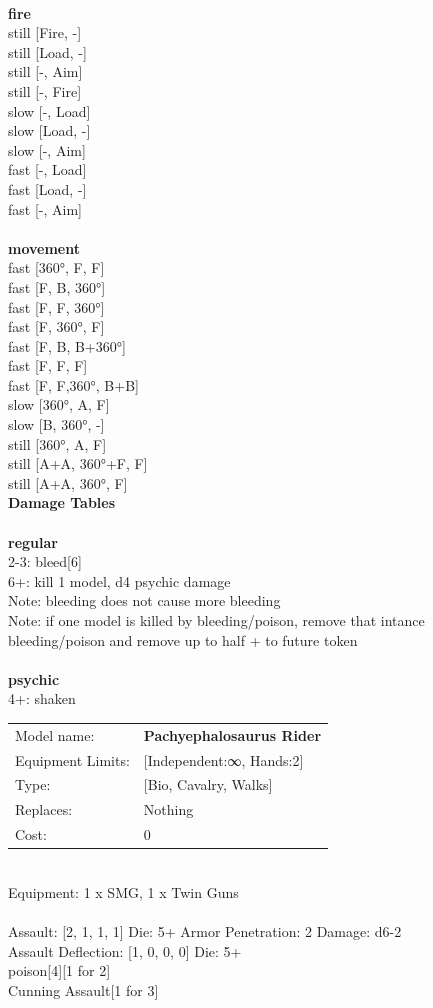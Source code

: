 \ \\ {\bf fire } \\
still [Fire, -] \\
still [Load, -] \\
still [-, Aim] \\
still [-, Fire] \\
slow [-, Load] \\
slow [Load, -] \\
slow [-, Aim] \\
fast [-, Load] \\
fast [Load, -] \\
fast [-, Aim] \\
\ \\ {\bf movement } \\
fast [360°, F, F] \\
fast [F, B, 360°] \\
fast [F, F, 360°] \\
fast [F, 360°, F] \\
fast [F, B, B+360°] \\
fast [F, F, F] \\
fast [F, F,360°, B+B] \\
slow [360°, A, F] \\
slow [B, 360°, -] \\
still [360°, A, F] \\
still [A+A, 360°+F, F] \\
still [A+A, 360°, F] \\


{\bf Damage Tables} \\
\ \\ {\bf regular } \\
2-3: bleed[6] \\
6+: kill 1 model, d4 psychic damage \\
Note: bleeding does not cause more bleeding \\
Note: if one model is killed by bleeding/poison, remove that intance \\ bleeding/poison and remove up to half + to future token \\
\ \\ {\bf psychic } \\
4+: shaken \\


\noindent
\begin{tabular}{ll}
Model name: &{\bf Pachyephalosaurus Rider } \\
Equipment Limits: &[Independent:∞, Hands:2] \\
Type: &[Bio, Cavalry, Walks] \\
Replaces: &Nothing \\
Cost: & 0\\
\end{tabular}
\ \\
Equipment: 1 x SMG, 1 x Twin Guns \\
\ \\
Assault: [2, 1, 1, 1] Die: 5+ Armor Penetration: 2 Damage: d6-2 \\
Assault Deflection: [1, 0, 0, 0] Die: 5+\\
\indent poison[4][1 for 2]\\ 
Cunning Assault[1 for 3]\\ 
 
